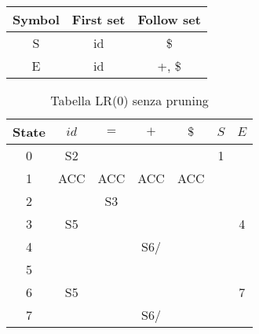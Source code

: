 \begin{center}
	\begin{tabular}{c c c}
		\toprule
		Symbol & First set & Follow set \\
		\midrule
		S      & id        & \$         \\
		E      & id        & +, \$      \\
		\bottomrule
	\end{tabular}
\end{center}

\begin{table}[H]
	\begin{center}
		\begin{tabular}{c c c c c c c}
			\toprule
			State & $id$         & $=$          & $+$             & $\$$         & $S$ & $E$ \\
			\midrule
			0     & S2           &              &                 &              & 1   &     \\
			1     & ACC          & ACC          & ACC             & ACC          &     &     \\
			2     &              & S3           &                 &              &     &     \\
			3     & S5           &              &                 &              &     & 4   \\
			4     & \rOneLabel   & \rOneLabel   & S6/\rOneLabel   & \rOneLabel   &     &     \\
			5     & \rTwoLabel   & \rTwoLabel   & \rTwoLabel      & \rTwoLabel   &     &     \\
			6     & S5           &              &                 &              &     & 7   \\
			7     & \rThreeLabel & \rThreeLabel & S6/\rThreeLabel & \rThreeLabel &     &     \\
			\bottomrule
		\end{tabular}
		\caption{Tabella LR(0) senza pruning}
	\end{center}
\end{table}

